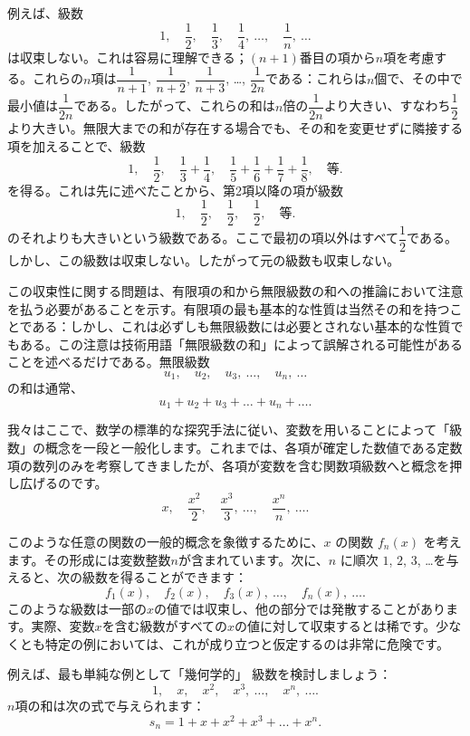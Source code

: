 \documentclass[a4paper,11pt,openany]{ltjsbook}
\providecommand{\Chg}[2]{#2}
\providecommand{\Add}[1]{\Chg{}{#1}}
\begin{document}
例えば、級数
\[
1,\quad
\dfrac{1}{2},\quad
\dfrac{1}{3},\quad
\dfrac{1}{4},\ \dots,\quad
\dfrac{1}{n},\ \dots
\]
は収束しない。これは容易に理解できる；$(n + 1)$番目の項から$n$項を考慮する。これらの$n$項は$\dfrac{1}{n + 1}$, $\dfrac{1}{n + 2}$, $\dfrac{1}{n + 3}$, \dots, $\dfrac{1}{2n}$である：これらは$n$個で、その中で最小値は$\dfrac{1}{2n}$である。したがって、これらの和は$n$倍の$\dfrac{1}{2n}$より大きい、すなわち$\dfrac{1}{2}$より大きい。無限大までの和が存在する場合でも、その和を変更せずに隣接する項を加えることで、級数
\[
1,\quad
\dfrac{1}{2},\quad
\dfrac{1}{3} + \dfrac{1}{4},\quad
\dfrac{1}{5} + \dfrac{1}{6} + \dfrac{1}{7} + \dfrac{1}{8},\quad
\text{等.}
\]
を得る。これは先に述べたことから、第2項以降の項が級数
\[
1,\quad
\dfrac{1}{2},\quad
\dfrac{1}{2},\quad
\dfrac{1}{2},\quad
\text{等.}
\]
のそれよりも大きいという級数である。ここで最初の項以外はすべて$\dfrac{1}{2}$である。しかし、この級数は収束しない。したがって元の級数も収束しない。

この収束性に関する問題は、有限項の和から無限級数の和への推論において注意を払う必要があることを示す。有限項の最も基本的な性質は当然その和を持つことである：しかし、これは必ずしも無限級数には必要とされない基本的な性質でもある。この注意は技術用語「無限級数の和」によって誤解される可能性があることを述べるだけである。無限級数
\[
u_{1},\quad
u_{2},\quad
u_{3},\ \dots,\quad
u_{n}\Add{,}\ \dots
\]
の和は通常、
\[
u_{1} + u_{2} + u_{3} + \dots + u_{n} + \dots\Add{.}
\]

我々はここで、数学の標準的な探究手法に従い、変数を用いることによって「級数」の概念を一段と一般化します。これまでは、各項が確定した数値である定数項の数列のみを考察してきましたが、各項が変数を含む関数項級数へと概念を押し広げるのです。
\[
x,\quad \frac{x^{2}}{2},\quad \frac{x^{3}}{3},\ \dots,\quad \frac{x^{n}}{n},\ \dots.
\]

このような任意の関数の一般的概念を象徴するために、$x$ の関数 $f_{n}(x)$ を考えます。その形成には変数整数$n$が含まれています。次に、$n$ に順次 $1$, $2$, $3$, \dots を与えると、次の級数を得ることができます：
\[
f_{1}(x),\quad f_{2}(x),\quad f_{3}(x),\ \dots,\quad f_{n}(x),\ \dots.
\]
このような級数は一部の$x$の値では収束し、他の部分では発散することがあります。実際、変数$x$を含む級数がすべての$x$の値に対して収束するとは稀です。少なくとも特定の例においては、これが成り立つと仮定するのは非常に危険です。

例えば、最も単純な例として「幾何学的」 級数を検討しましょう：
\[
1,\quad x,\quad x^{2},\quad x^{3},\ \dots,\quad x^{n},\ \dots.
\]
$n$項の和は次の式で与えられます：
\[
s_{n} = 1 + x + x^{2} + x^{3} + \dots + x^{n}.
\]
\end{document}
